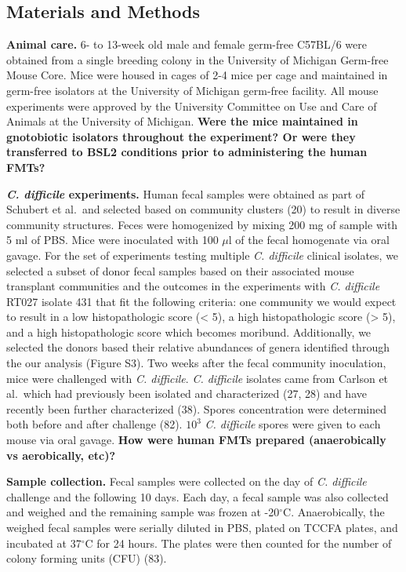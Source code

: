 \documentclass[
  12pt,
]{article}
\begin{document}
\hypertarget{materials-and-methods}{%
\subsection{Materials and Methods}\label{materials-and-methods}}

\textbf{Animal care.} 6- to 13-week old male and female germ-free
C57BL/6 were obtained from a single breeding colony in the University of
Michigan Germ-free Mouse Core. Mice were housed in cages of 2-4 mice per
cage and maintained in germ-free isolators at the University of Michigan
germ-free facility. All mouse experiments were approved by the
University Committee on Use and Care of Animals at the University of
Michigan. \textbf{Were the mice maintained in gnotobiotic isolators
throughout the experiment? Or were they transferred to BSL2 conditions
prior to administering the human FMTs?}

\textbf{\emph{C. difficile} experiments.} Human fecal samples were
obtained as part of Schubert et al.~and selected based on community
clusters (20) to result in diverse community structures. Feces were
homogenized by mixing 200 mg of sample with 5 ml of PBS. Mice were
inoculated with 100 \(\mu\)l of the fecal homogenate via oral gavage.
For the set of experiments testing multiple \emph{C. difficile} clinical
isolates, we selected a subset of donor fecal samples based on their
associated mouse transplant communities and the outcomes in the
experiments with \emph{C. difficile} RT027 isolate 431 that fit the
following criteria: one community we would expect to result in a low
histopathologic score (\textless{} 5), a high histopathologic score
(\textgreater{} 5), and a high histopathologic score which becomes
moribund. Additionally, we selected the donors based their relative
abundances of genera identified through the our analysis (Figure S3).
Two weeks after the fecal community inoculation, mice were challenged
with \emph{C. difficile}. \emph{C. difficile} isolates came from Carlson
et al.~which had previously been isolated and characterized (27, 28) and
have recently been further characterized (38). Spores concentration were
determined both before and after challenge (82). \(10^{3}\) \emph{C.
difficile} spores were given to each mouse via oral gavage. \textbf{How
were human FMTs prepared (anaerobically vs aerobically, etc)?}

\textbf{Sample collection.} Fecal samples were collected on the day of
\emph{C. difficile} challenge and the following 10 days. Each day, a
fecal sample was also collected and weighed and the remaining sample was
frozen at -20\(^\circ\)C. Anaerobically, the weighed fecal samples were
serially diluted in PBS, plated on TCCFA plates, and incubated at
37\(^\circ\)C for 24 hours. The plates were then counted for the number
of colony forming units (CFU) (83).
\end{document}
